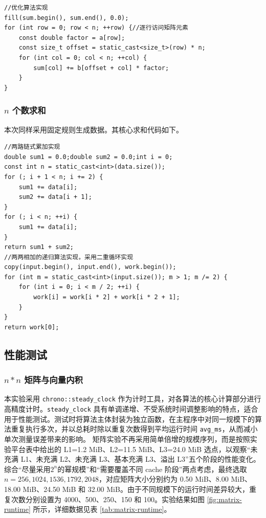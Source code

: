 ﻿\documentclass[UTF8,a4paper,12pt]{ctexart}
\begin{document}
\begin{lstlisting}[caption={矩阵与向量内积的优化算法核心实现}]
//优化算法实现
fill(sum.begin(), sum.end(), 0.0);
for (int row = 0; row < n; ++row) {//逐行访问矩阵元素
    const double factor = a[row];
    const size_t offset = static_cast<size_t>(row) * n;
    for (int col = 0; col < n; ++col) {
        sum[col] += b[offset + col] * factor;
    }
}

\end{lstlisting}

\subsubsection{\(n\) 个数求和}
本次同样采用固定规则生成数据。其核心求和代码如下。

\begin{lstlisting}[caption={两种求和优化核心实现}]
//两路链式累加实现
double sum1 = 0.0;double sum2 = 0.0;int i = 0;
const int n = static_cast<int>(data.size());
for (; i + 1 < n; i += 2) {
    sum1 += data[i];
    sum2 += data[i + 1];
}
for (; i < n; ++i) {
    sum1 += data[i];
}
return sum1 + sum2;
//两两相加的递归算法实现，采用二重循环实现
copy(input.begin(), input.end(), work.begin());
for (int m = static_cast<int>(input.size()); m > 1; m /= 2) {
    for (int i = 0; i < m / 2; ++i) {
        work[i] = work[i * 2] + work[i * 2 + 1];
    }
}
return work[0];

\end{lstlisting}

\subsection{性能测试}

\subsubsection{\(n*n\) 矩阵与向量内积}

本实验采用 \texttt{chrono::steady\_clock} 作为计时工具，对各算法的核心计算部分进行高精度计时。\texttt{steady\_clock} 具有单调递增、不受系统时间调整影响的特点，适合用于性能测试。测试时将算法主体封装为独立函数，在主程序中对同一规模下的算法重复执行多次，并以总耗时除以重复次数得到平均运行时间 \texttt{avg\_ms}，从而减小单次测量误差带来的影响。
矩阵实验不再采用简单倍增的规模序列，而是按照实验平台表中给出的 L1=1.2 MiB、L2=11.5 MiB、L3=24.0 MiB 选点，以观察“未充满 L1、未充满 L2、未充满 L3、基本充满 L3、溢出 L3”五个阶段的性能变化。综合“尽量采用$ 2^n $的幂规模”和“需要覆盖不同 cache 阶段”两点考虑，最终选取 \(n=256,1024,1536,1792,2048\)，对应矩阵大小分别约为 0.50 MiB、8.00 MiB、18.00 MiB、24.50 MiB 和 32.00 MiB。由于不同规模下的运行时间差异较大，重复次数分别设置为 4000、500、250、150 和 100。实验结果如图 \ref{fig:matrix-runtime} 所示，详细数据见表 \ref{tab:matrix-runtime}。
\end{document}

